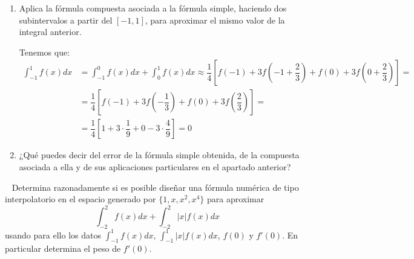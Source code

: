 \begin{ejercicio}
\begin{enumerate}
        \item Aplica la fórmula compuesta asociada a la fórmula simple, haciendo dos subintervalos a partir del $[-1,1]$, para aproximar el mismo valor de la integral anterior.
        
        Tenemos que:
        \begin{align*}
            \int_{-1}^{1} f(x)dx &= \int_{-1}^{0} f(x)dx + \int_{0}^{1} f(x)dx
            \approx \dfrac{1}{4}\left[f(-1) + 3f\left(-1+\dfrac{2}{3}\right) + f(0) + 3f\left(0+\dfrac{2}{3}\right)\right]
            =\\&= \dfrac{1}{4}\left[f(-1) + 3f\left(-\dfrac{1}{3}\right) + f(0) + 3f\left(\dfrac{2}{3}\right)\right]
            =\\&= \dfrac{1}{4}\left[1 + 3\cdot \dfrac{1}{9} + 0 -3\cdot \dfrac{4}{9}\right] = 0
        \end{align*}
        \item ¿Qué puedes decir del error de la fórmula simple obtenida, de la compuesta asociada a ella y de sus aplicaciones particulares en el apartado anterior?
    \end{enumerate}
\end{ejercicio}

\begin{ejercicio}~\label{ej:2.3.2}
    Determina razonadamente si es posible diseñar una fórmula numérica de tipo interpolatorio en el espacio generado por $\{1, x, x^2, x^4\}$ para aproximar
    \begin{equation*}
        \int_{-2}^{2} f(x) dx + \int_{-2}^{2} |x|f(x) dx
    \end{equation*}
    usando para ello los datos $\int_{-1}^{1} f(x) dx$, $\int_{-1}^{1} |x|f(x) dx$, $f(0)$ y $f'(0)$. En particular determina el peso de $f'(0)$.
\end{ejercicio}

